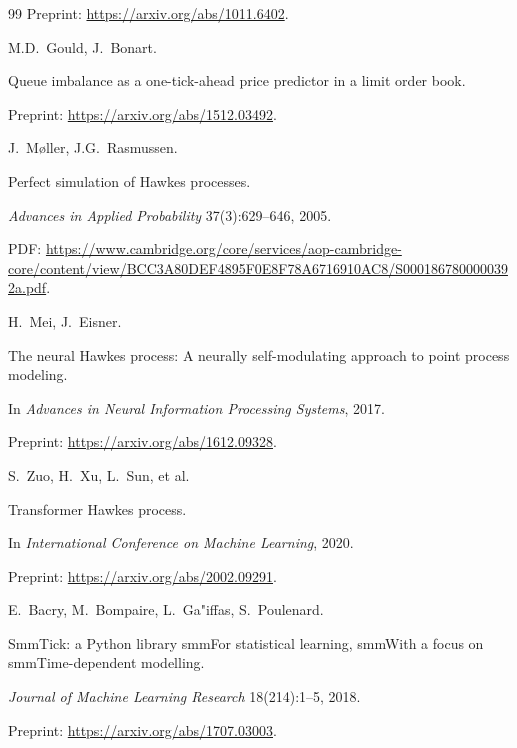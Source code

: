 \documentclass[11pt]{article}
\newcommand{\1}{\mathbbm{1}}
\begin{document}
\begin{thebibliography}{99}
Preprint: \url{https://arxiv.org/abs/1011.6402}.




M.D.~Gould, J.~Bonart.

Queue imbalance as a one-tick-ahead price predictor in a limit order book.

Preprint: \url{https://arxiv.org/abs/1512.03492}.




J.~M{\o}ller, J.G.~Rasmussen.

Perfect simulation of Hawkes processes.

\emph{Advances in Applied Probability} 37(3):629--646, 2005.

PDF: \url{https://www.cambridge.org/core/services/aop-cambridge-core/content/view/BCC3A80DEF4895F0E8F78A6716910AC8/S0001867800000392a.pdf}.




H.~Mei, J.~Eisner.

The neural Hawkes process: A neurally self-modulating approach to point process modeling.

In \emph{Advances in Neural Information Processing Systems}, 2017.

Preprint: \url{https://arxiv.org/abs/1612.09328}.




S.~Zuo, H.~Xu, L.~Sun, et al.

Transformer Hawkes process.

In \emph{International Conference on Machine Learning}, 2020.

Preprint: \url{https://arxiv.org/abs/2002.09291}.




E.~Bacry, M.~Bompaire, L.~Ga"{i}ffas, S.~Poulenard.

SmmTick: a Python library smmFor statistical learning, smmWith a focus on smmTime-dependent modelling.

\emph{Journal of Machine Learning Research} 18(214):1--5, 2018.

Preprint: \url{https://arxiv.org/abs/1707.03003}.



\end{thebibliography}
\end{document}
